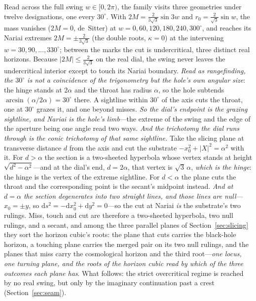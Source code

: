 \documentclass[11pt,a4paper]{article}
\theoremstyle{definition}
\newcommand{\dd}{\mathrm{d}}   %
\begin{document}
Read across the full swing $w\in[0,2\pi)$, the family visits three geometries under twelve designations, one every $30^{\circ}$. With $2M=\tfrac{2}{3\sqrt3}\sin 3w$ and $r_{0}=\tfrac{2}{\sqrt3}\sin w$, the mass vanishes ($2M=0$, de~Sitter) at $w=0,60,120,180,240,300^{\circ}$, and reaches its Nariai extremes $2M=\pm\tfrac{2}{3\sqrt3}$ (the double roots, $\kappa=0$) at the intervening $w=30,90,\dots,330^{\circ}$; between the marks the cut is undercritical, three distinct real horizons. Because $|2M|\le\tfrac{2}{3\sqrt3}$ on the real dial, the swing never leaves the undercritical interior except to touch its Nariai boundary. \emph{Read as rangefinding, the $30^{\circ}$ is not a coincidence of the trigonometry but the hole's own angular size}: the hinge stands at $2\alpha$ and the throat has radius $\alpha$, so the hole subtends $\arcsin(\alpha/2\alpha)=30^{\circ}$ there. A sightline within $30^{\circ}$ of the axis cuts the throat, one at $30^{\circ}$ grazes it, and one beyond misses. \emph{So the dial's endpoint is the grazing sightline, and Nariai is the hole's limb}---the extreme of the swing and the edge of the aperture being one angle read two ways. \emph{And the trichotomy the dial runs through is the conic trichotomy of that same sightline.} Take the slicing plane at transverse distance $d$ from the axis and cut the substrate $-x_{0}^{2}+\lvert X\rvert^{2}=\alpha^{2}$ with it. For $d>\alpha$ the section is a two-sheeted hyperbola whose vertex stands at height $\sqrt{d^{2}-\alpha^{2}}$---and at the dial's end, $d=2\alpha$, that vertex is $\sqrt3\,\alpha$, \emph{which is the hinge}: the hinge is the vertex of the extreme sightline. For $d<\alpha$ the plane cuts the throat and the corresponding point is the secant's midpoint instead. \emph{And at $d=\alpha$ the section degenerates into two straight lines, and those lines are null}---$x_{0}=\pm y$, so $\dd s^{2}=-\dd x_{0}^{2}+\dd y^{2}=0$---so the cut at Nariai \emph{is} the substrate's two rulings. Miss, touch and cut are therefore a two-sheeted hyperbola, two null rulings, and a secant, and among the three parallel planes of Section~\ref{sec:slicing} they sort the horizon cubic's roots: the plane that cuts carries the black-hole horizon, a touching plane carries the merged pair on its two null rulings, and the planes that miss carry the cosmological horizon and the third root---\emph{one locus, one turning plane, and the roots of the horizon cubic read by which of the three outcomes each plane has}. What follows: the strict overcritical regime is reached by no real swing, but only by the imaginary continuation past a crest (Section~\ref{sec:seam}).
\end{document}
